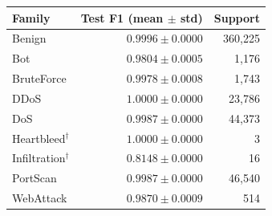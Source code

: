 \begin{tabular}{lrr}
\toprule
Family & Test F1 (mean $\pm$ std) & Support \\
\midrule
Benign & $0.9996 \pm 0.0000$ & 360,225 \\
Bot & $0.9804 \pm 0.0005$ & 1,176 \\
BruteForce & $0.9978 \pm 0.0008$ & 1,743 \\
DDoS & $1.0000 \pm 0.0000$ & 23,786 \\
DoS & $0.9987 \pm 0.0000$ & 44,373 \\
Heartbleed$^{\dagger}$ & $1.0000 \pm 0.0000$ & 3 \\
Infiltration$^{\dagger}$ & $0.8148 \pm 0.0000$ & 16 \\
PortScan & $0.9987 \pm 0.0000$ & 46,540 \\
WebAttack & $0.9870 \pm 0.0009$ & 514 \\
\bottomrule
\end{tabular}